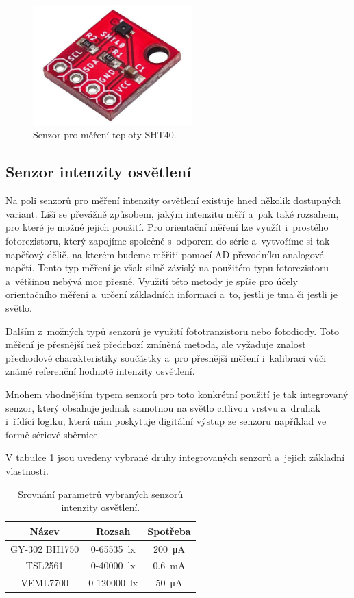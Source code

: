 \begin{figure}
    \centering
    \includegraphics[width=0.55\textwidth]{obrazky/sht40.jpg}
    \caption{Senzor pro měření teploty SHT40. \cite{SHT40}}
    \label{fig_SHT40}
\end{figure}

\subsection{Senzor intenzity osvětlení}

Na poli senzorů pro měření intenzity osvětlení existuje hned několik dostupných variant. Liší se převážně způsobem, jakým intenzitu měří a~pak také rozsahem, pro které je možné jejich použití. Pro orientační měření lze využít i~prostého fotorezistoru, který zapojíme společně s~odporem do série a~vytvoříme si tak napěťový dělič, na kterém budeme měřiti pomocí AD převodníku analogové napětí. Tento typ měření je však silně závislý na použitém typu fotorezistoru a~většinou nebývá moc přesné. Využití této metody je spíše pro účely orientačního měření a~určení základních informací a~to, jestli je tma či jestli je světlo. 

Dalším z~možných typů senzorů je využití fototranzistoru nebo fotodiody. Toto měření je přesnější než předchozí zmíněná metoda, ale vyžaduje znalost přechodové charakteristiky součástky a~pro přesnější měření i~kalibraci vůči známé referenční hodnotě intenzity osvětlení.

Mnohem vhodnějším typem senzorů pro toto konkrétní použití je tak integrovaný senzor, který obsahuje jednak samotnou na světlo citlivou vrstvu a~druhak i~řídící logiku, která nám poskytuje digitální výstup ze senzoru například ve formě sériové sběrnice.

V tabulce \ref{tab_LuxIntensitySensors} jsou uvedeny vybrané druhy integrovaných senzorů a~jejich základní vlastnosti.

\begin{table}[h]
    \centering
    \begin{tabular}{c|cc}
        \textbf{Název} & \textbf{Rozsah}            & \textbf{Spotřeba}         \\ \hline
        GY-302 BH1750  & \SI{0}{}-\SI{65535}{\lux}  & \SI{200}{\micro\ampere}   \\
        TSL2561        & \SI{0}{}-\SI{40000}{\lux}  & \SI{0,6}{\milli\ampere}   \\
        VEML7700       & \SI{0}{}-\SI{120000}{\lux} & \SI{50}{\micro\ampere}
    \end{tabular}
    \caption{Srovnání parametrů vybraných senzorů intenzity osvětlení.}
    \label{tab_LuxIntensitySensors}
\end{table}

